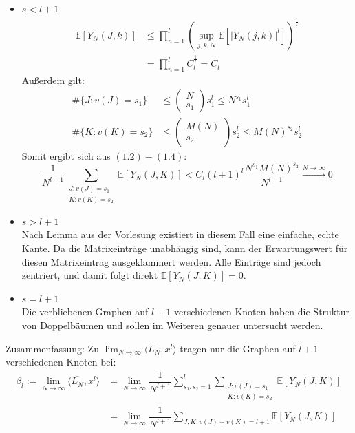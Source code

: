 \documentclass[a4paper, 11pt]{scrreprt}
\newcommand{\EE}{\mathbb{E}}
\begin{document}
\begin{itemize}
	\item \(s < l+ 1\)\\
		\begin{equation}
			\begin{split}
			\EE[Y_N(J,k)] &\leq \prod_{n=1}^l \left(\sup_{j,k,N}\EE\left[|Y_N(j,k)|^l\right]\right)^{\frac 1 l} \\
			& = \prod_{n=1}^l C_l^{\frac 1 l} = C_l
			\end{split}
			\end{equation}
	Außerdem gilt: 
		\begin{align}
			\#\{J: v(J)=s_1\} &\leq \begin{pmatrix} N \\ s_1 \end{pmatrix} s_1^l \leq N^{s_1}s_1^l \\
			\#\{K: v(K)=s_2\} &\leq \begin{pmatrix} M(N) \\ s_2 \end{pmatrix} s_2^l \leq M(N)^{s_2}s_2^l
		\end{align}
	Somit ergibt sich aus \((1.2) - (1.4)\): 
	\begin{equation}
		\frac {1}{N^{l+1}} \sum_{\substack{J:v(J)=s_1\\ K:v(K)=s_2 }} \EE[Y_N(J,K)] < C_l (l+1)^l \frac{N^{s_1} M(N)^{s_2}}{N^{l+1}} \xrightarrow{N\to\infty} 0
	\end{equation}
		
	\item \(s> l+1\) \\
		Nach Lemma aus der Vorlesung existiert in diesem Fall eine einfache, echte Kante. Da die Matrixeinträge unabhängig sind, kann der Erwartungswert für diesen Matrixeintrag ausgeklammert werden. Alle Einträge sind jedoch zentriert, und damit folgt direkt \(\EE[Y_N(J,K)]=0\).
	\item \(s=l+1\)\\
		Die verbliebenen Graphen auf \(l+1\) verschiedenen Knoten haben die Struktur von Doppelbäumen und sollen im Weiteren genauer untersucht werden.\\
\end{itemize}		
Zusammenfassung: Zu \(\lim_{N\to\infty} \langle \overline{L_N}, x^l \rangle \) tragen nur die Graphen auf $ l+1 $ verschiedenen Knoten bei:\\

\begin{equation}
\begin{split}
\beta_l:= \lim_{N\to\infty} \langle \overline{L_N}, x^l \rangle &= \lim_{N\to\infty} \dfrac{1}{N^{l+1}} \sum_{s_1,s_2 = 1}^l \sum_{\substack{J:v(J)=s_1\\ K:v(K)=s_2 }} \EE[Y_N(J,K)]\\ &= \lim_{N\to\infty} \dfrac{1}{N^{l+1}}\sum_{J,K: v(J)+v(K) = l+1} \EE[Y_N(J,K)]  
\end{split}
\end{equation}
\end{document}
